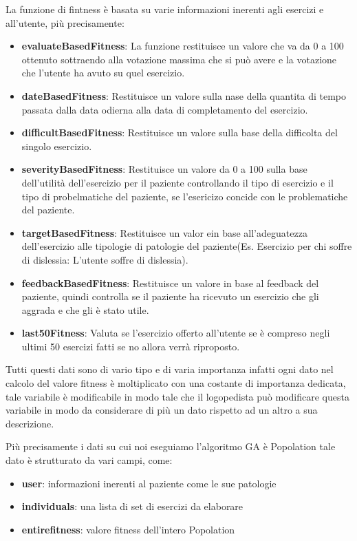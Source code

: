 \documentclass{article}
\begin{document}
    La funzione di fintness è basata su varie informazioni inerenti agli esercizi e all'utente, più precisamente:

    \begin{itemize}
\item\textbf{evaluateBasedFitness}: La funzione restituisce un valore che va da 0 a 100 ottenuto sottraendo alla votazione massima che si può avere e la votazione che l'utente ha avuto su quel esercizio.

\item\textbf{dateBasedFitness}: Restituisce un valore sulla nase della quantita di tempo passata dalla data odierna alla data di completamento del esercizio.

\item\textbf{difficultBasedFitness}: Restituisce un valore sulla base della difficolta del singolo esercizio.

\item\textbf{severityBasedFitness}: Restituisce un valore da 0 a 100 sulla base dell'utilità dell'esercizio per il paziente controllando il tipo di esercizio e il tipo di probelmatiche del paziente, se l'esericizo concide con le problematiche del paziente.

\item\textbf{targetBasedFitness}: Restituisce un valor ein base all'adeguatezza dell'esercizio alle tipologie di patologie del paziente(Es. Esercizio per chi soffre di dislessia: L'utente soffre di dislessia).

\item\textbf{feedbackBasedFitness}: Restituisce un valore in base al feedback del paziente, quindi controlla se il paziente ha ricevuto un esercizio che gli aggrada e che gli è stato utile.

\item\textbf{last50Fitness}: Valuta se l'esercizio offerto all'utente se è compreso negli ultimi 50 esercizi fatti se no allora verrà riproposto.
    \end{itemize}

Tutti questi dati sono di vario tipo e di varia importanza infatti ogni dato nel calcolo del valore fitness è moltiplicato con una costante di importanza dedicata, tale variabile è modificabile in modo tale che il logopedista può modificare questa variabile in modo da considerare di più un dato rispetto ad un altro a sua descrizione.


Più precisamente i dati su cui noi eseguiamo l'algoritmo GA è Popolation tale dato è strutturato da vari campi, come:
\begin{itemize}

\item\textbf{user}: informazioni inerenti al paziente come le sue patologie

\item\textbf{individuals}: una lista di set di esercizi da elaborare

\item\textbf{entirefitness}: valore fitness dell'intero Popolation

\end{itemize}
\end{document}
